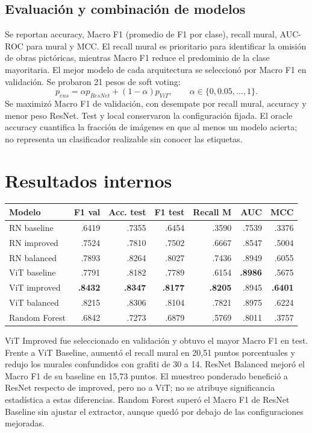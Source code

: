 \documentclass[10pt,a4paper]{article}
\begin{document}
\subsection{Evaluación y combinación de modelos}
Se reportan accuracy, Macro F1 (promedio de F1 por clase), recall mural, AUC-ROC para mural y MCC. El recall mural es prioritario para identificar la omisión de obras pictóricas, mientras Macro F1 reduce el predominio de la clase mayoritaria. El mejor modelo de cada arquitectura se seleccionó por Macro F1 en validación. Se probaron 21 pesos de soft voting:
\[p_{ens}=\alpha p_{ResNet}+(1-\alpha)p_{ViT},\qquad \alpha\in\{0,0.05,\ldots,1\}.\]
Se maximizó Macro F1 de validación, con desempate por recall mural, accuracy y menor peso ResNet. Test y local conservaron la configuración fijada. El oracle accuracy cuantifica la fracción de imágenes en que al menos un modelo acierta; no representa un clasificador realizable sin conocer las etiquetas.
\section{Resultados internos}
\begin{center}\small
\begin{tabular}{lrrrrrr}\toprule Modelo & F1 val & Acc. test & F1 test & Recall M & AUC & MCC\\\midrule RN baseline&.6419&.7355&.6454&.3590&.7539&.3376\\ RN improved&.7524&.7810&.7502&.6667&.8547&.5004\\ RN balanced&.7893&.8264&.8027&.7436&.8949&.6055\\ ViT baseline&.7791&.8182&.7789&.6154&\textbf{.8986}&.5675\\ ViT improved&\textbf{.8432}&\textbf{.8347}&\textbf{.8177}&\textbf{.8205}&.8945&\textbf{.6401}\\ ViT balanced&.8215&.8306&.8104&.7821&.8975&.6224\\ Random Forest&.6842&.7273&.6879&.5769&.8011&.3757\\\bottomrule\end{tabular}
\end{center}
ViT Improved fue seleccionado en validación y obtuvo el mayor Macro F1 en test. Frente a ViT Baseline, aumentó el recall mural en 20,51 puntos porcentuales y redujo los murales confundidos con grafiti de 30 a 14. ResNet Balanced mejoró el Macro F1 de su baseline en 15,73 puntos. El muestreo ponderado benefició a ResNet respecto de improved, pero no a ViT; no se atribuye significancia estadística a estas diferencias. Random Forest superó el Macro F1 de ResNet Baseline sin ajustar el extractor, aunque quedó por debajo de las configuraciones mejoradas.
\end{document}
